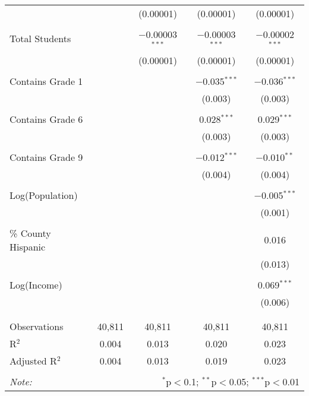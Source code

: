 \begin{table}[!htbp]
\begin{tabular}{@{\extracolsep{-2pt}}lcccc}
  &  & (0.00001) & (0.00001) & (0.00001) \\ 
  & & & & \\ 
 Total Students &  & $-$0.00003$^{***}$ & $-$0.00003$^{***}$ & $-$0.00002$^{***}$ \\ 
  &  & (0.00001) & (0.00001) & (0.00001) \\ 
  & & & & \\ 
 Contains Grade 1 &  &  & $-$0.035$^{***}$ & $-$0.036$^{***}$ \\ 
  &  &  & (0.003) & (0.003) \\ 
  & & & & \\ 
 Contains Grade 6 &  &  & 0.028$^{***}$ & 0.029$^{***}$ \\ 
  &  &  & (0.003) & (0.003) \\ 
  & & & & \\ 
 Contains Grade 9 &  &  & $-$0.012$^{***}$ & $-$0.010$^{**}$ \\ 
  &  &  & (0.004) & (0.004) \\ 
  & & & & \\ 
 Log(Population) &  &  &  & $-$0.005$^{***}$ \\ 
  &  &  &  & (0.001) \\ 
  & & & & \\ 
 \% County Hispanic &  &  &  & 0.016 \\ 
  &  &  &  & (0.013) \\ 
  & & & & \\ 
 Log(Income) &  &  &  & 0.069$^{***}$ \\ 
  &  &  &  & (0.006) \\ 
  & & & & \\ 
\hline \\[-1.8ex] 
Observations & 40,811 & 40,811 & 40,811 & 40,811 \\ 
R$^{2}$ & 0.004 & 0.013 & 0.020 & 0.023 \\ 
Adjusted R$^{2}$ & 0.004 & 0.013 & 0.019 & 0.023 \\ 
\hline 
\hline \\[-1.8ex] 
\textit{Note:}  & \multicolumn{4}{r}{$^{*}$p$<$0.1; $^{**}$p$<$0.05; $^{***}$p$<$0.01} \\ 
\end{tabular} 
\end{table} 
